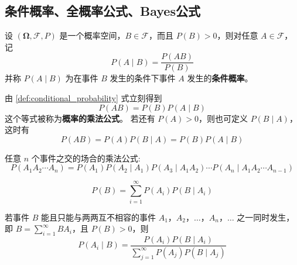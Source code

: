 \subsection{条件概率、全概率公式、Bayes公式}\label{subsec:条件概率、全概率公式、Bayes公式}
\begin{definition}[条件概率] \label{def:conditional_probability}
设 $(\boldsymbol{\Omega},\mathcal{F},P)$ 是一个概率空间，$B \in \mathcal{F}$，而且 $P(B)>0$，则对任意 $A \in \mathcal{F}$，记
\begin{equation} \label{eq:conditional_probability_formula}
P(A \mid B) = \frac{P(AB)}{P(B)}
\end{equation}
并称 $P(A \mid B)$ 为在事件 $B$ 发生的条件下事件 $A$ 发生的\textbf{条件概率}。
\end{definition}
\begin{remark}\label{rmk:乘法公式}
    由 \eqref{def:conditional_probability} 式立刻得到
\begin{equation} \label{eq:multiplication_formula}
P(AB) = P(B)P(A \mid B)
\end{equation}
这个等式被称为\textbf{概率的乘法公式}。
若还有 $P(A)>0$，则也可定义 $P(B \mid A)$，这时有
\begin{equation} \label{eq:multiplication_formula_symmetric}
P(AB) = P(A)P(B \mid A) = P(B)P(A \mid B)
\end{equation}
\end{remark}
\begin{proposition}[推广的乘法公式]\label{prop:推广的乘法公式}
    任意 $n$ 个事件之交的场合的乘法公式:
\begin{equation} \label{eq:generalized_multiplication_formula}
P(A_1 A_2 \cdots A_n) = P(A_1)P(A_2 \mid A_1)P(A_3 \mid A_1 A_2)\cdots P(A_n \mid A_1 A_2 \cdots A_{n-1})
\end{equation}
\end{proposition}
\begin{proposition}[全概率公式]\label{prop:全概率公式}
    \begin{equation} \label{eq:total_probability_formula}
P(B) = \sum_{i=1}^\infty P(A_i)P(B \mid A_i)
\end{equation}
\end{proposition}
\begin{proposition} \label{prop:bayes_formula}
若事件 $B$ 能且只能与两两互不相容的事件 $A_1，A_2，\ldots，A_n，\ldots$ 之一同时发生，即 $B = \sum_{i=1}^\infty BA_i$，且 $P(B) > 0$，则
\begin{equation} \label{eq:bayes_formula}
P(A_i \mid B) = \frac{P(A_i)P(B \mid A_i)}{\sum_{j=1}^\infty P(A_j)P(B \mid A_j)}
\end{equation}
\end{proposition}

